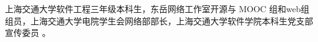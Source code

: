 

\begin{cvparagraph}
\begin{minipage}[t]{\textwidth}
上海交通大学软件工程三年级本科生，东岳网络工作室开源与 MOOC 组和web组组员，上海交通大学电院学生会网络部部长，上海交通大学软件学院本科生党支部宣传委员
。
\end{minipage}
\end{cvparagraph}
